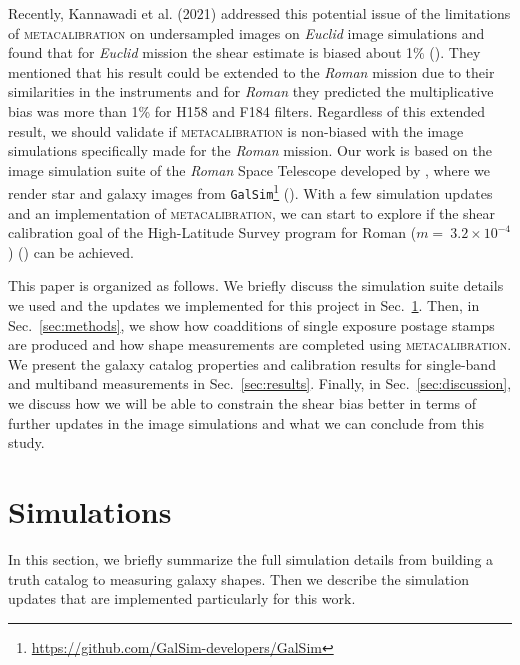 \documentclass[fleqn,usenatbib]{mnras}
\begin{document}
Recently, Kannawadi et al. (2021) addressed this potential issue of the limitations of \textsc{metacalibration} on undersampled images on \emph{Euclid} image simulations and found that for \emph{Euclid} mission the shear estimate is biased about 1$\%$ (\citealt{2021MNRAS.502.4048K}). They mentioned that his result could be extended to the \emph{Roman} mission due to their similarities in the instruments and for \emph{Roman} they predicted the multiplicative bias was more than 1\% for H158 and F184 filters. Regardless of this extended result, we should validate if \textsc{metacalibration} is non-biased with the image simulations specifically made for the \emph{Roman} mission. Our work is based on the image simulation suite of the \emph{Roman} Space Telescope developed by \citet{2021MNRAS.501.2044T}, where we render star and galaxy images from \texttt{GalSim}\footnote{\url{ https://github.com/GalSim-developers/GalSim}} (\citealt{2015A&C....10..121R}). With a few simulation updates and an implementation of \textsc{metacalibration}, we can start to explore if the shear calibration goal of the High-Latitude Survey program for Roman ($m=~3.2\times10^{-4}$) (\citealt{2019BAAS...51c.341D}) can be achieved. \par


This paper is organized as follows. We briefly discuss the simulation suite details we used and the updates we implemented for this project in Sec.~\ref{sec:sims}. Then, in Sec.~\ref{sec:methods}, we show how coadditions of single exposure postage stamps are produced and how shape measurements are completed using \textsc{metacalibration}. We present the galaxy catalog properties and calibration results for single-band and multiband measurements in Sec.~\ref{sec:results}. Finally, in Sec.~\ref{sec:discussion}, we discuss how we will be able to constrain the shear bias better in terms of further updates in the image simulations and what we can conclude from this study. 


\section{Simulations}
\label{sec:sims}
In this section, we briefly summarize the full simulation details from building a truth catalog to measuring galaxy shapes. Then we describe the simulation updates that are implemented particularly for this work.
\end{document}
